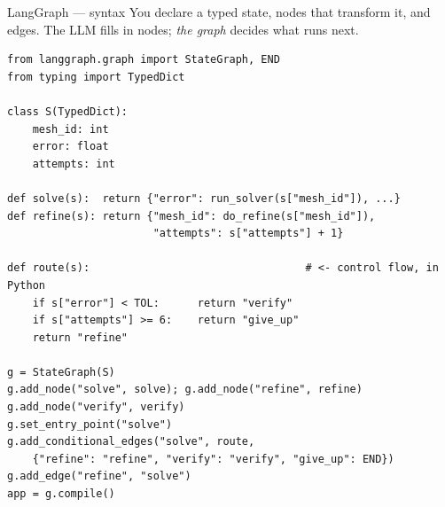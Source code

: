 \documentclass[aspectratio=169,10pt]{beamer}
\begin{document}
\begin{frame}[fragile]{LangGraph --- syntax}
You declare a typed state, nodes that transform it, and edges. The LLM fills
in nodes; \emph{the graph} decides what runs next.

\begin{lstlisting}
from langgraph.graph import StateGraph, END
from typing import TypedDict

class S(TypedDict):
    mesh_id: int
    error: float
    attempts: int

def solve(s):  return {"error": run_solver(s["mesh_id"]), ...}
def refine(s): return {"mesh_id": do_refine(s["mesh_id"]),
                       "attempts": s["attempts"] + 1}

def route(s):                                  # <- control flow, in Python
    if s["error"] < TOL:      return "verify"
    if s["attempts"] >= 6:    return "give_up"
    return "refine"

g = StateGraph(S)
g.add_node("solve", solve); g.add_node("refine", refine)
g.add_node("verify", verify)
g.set_entry_point("solve")
g.add_conditional_edges("solve", route,
    {"refine": "refine", "verify": "verify", "give_up": END})
g.add_edge("refine", "solve")
app = g.compile()
\end{lstlisting}
\end{frame}
\end{document}
